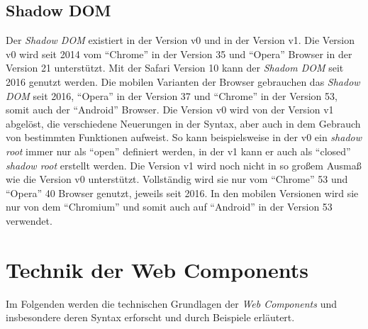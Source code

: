 \documentclass[12pt, paper=a4, bibtotoc, toc=listof, headsepline=true]{scrreprt}
\begin{document}
		\subsection{Shadow DOM}
		Der \emph{Shadow \ac{DOM}} existiert in der Version v0 und in der Version v1. Die Version v0 wird seit 2014 vom \enquote{Chrome} in der Version 35 und \enquote{Opera} Browser in der Version 21 unterstützt. Mit der Safari Version 10 kann der \emph{Shadom \ac{DOM}} seit 2016  genutzt werden\cite{NiwaShaDom}. Die mobilen Varianten der Browser gebrauchen das \emph{Shadow \ac{DOM}} seit 2016, \enquote{Opera} in der Version 37 und \enquote{Chrome} in der Version 53, somit auch der \enquote{Android} Browser\cite{Hayato2016}. Die Version v0 wird von der Version v1 abgelöst, die verschiedene Neuerungen in der Syntax, aber auch in dem Gebrauch von bestimmten Funktionen aufweist. So kann beispielsweise in der v0 ein \emph{shadow root} immer nur als \enquote{open} definiert werden, in der v1 kann er auch als \enquote{closed} \emph{shadow root} erstellt werden\cite{Ito2016}.
		Die Version v1 wird noch nicht in so großem Ausmaß wie die Version v0 unterstützt. Vollständig wird sie nur vom \enquote{Chrome} 53 und \enquote{Opera} 40 Browser genutzt, jeweils seit 2016. In den mobilen Versionen wird sie nur von dem \enquote{Chromium} und somit auch auf \enquote{Android} in der Version 53 verwendet\cite{Hayato2016a}.
	
			
	\section{Technik der Web Components}
	Im Folgenden werden die technischen Grundlagen der \emph{Web Components} und insbesondere deren Syntax erforscht und durch Beispiele erläutert.
\end{document}
